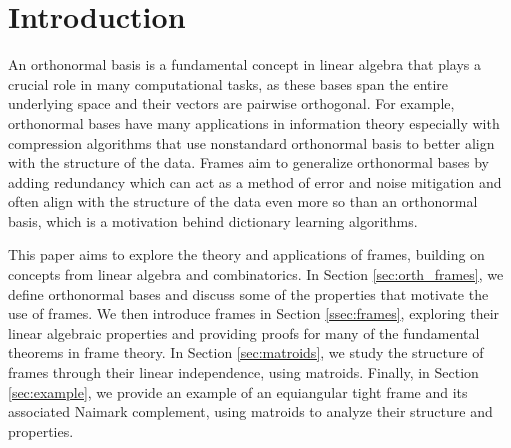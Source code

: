 \section{Introduction}
\label{sec:intro}
An orthonormal basis is a fundamental concept in linear algebra that plays a crucial role in many computational tasks, as these bases span the entire underlying space and their vectors are pairwise orthogonal. For example, orthonormal bases have many applications in information theory especially with compression algorithms that use nonstandard orthonormal basis to better align with the structure of the data. Frames aim to generalize orthonormal bases by adding redundancy which can act as a method of error and noise mitigation and often align with the structure of the data even more so than an orthonormal basis, which is a motivation behind dictionary learning algorithms.

This paper aims to explore the theory and applications of frames, building on concepts from linear algebra and combinatorics. In Section \ref{sec:orth_frames}, we define orthonormal bases and discuss some of the properties that motivate the use of frames. We then introduce frames in Section \ref{ssec:frames}, exploring their linear algebraic properties and providing proofs for many of the fundamental theorems in frame theory. In Section \ref{sec:matroids}, we study the structure of frames through their linear independence, using matroids. Finally, in Section \ref{sec:example}, we provide an example of an equiangular tight frame and its associated Naimark complement, using matroids to analyze their structure and properties.

